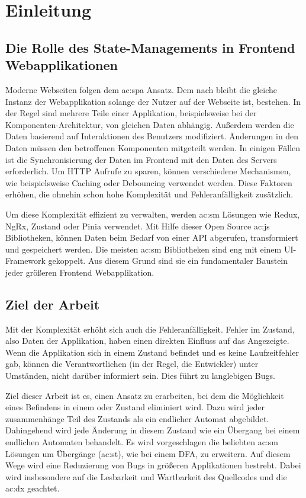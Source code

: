 \chapter{Einleitung}

\section{Die Rolle des State-Managements in Frontend Webapplikationen}

Moderne Webseiten folgen dem \acrlong{ac:spa} Ansatz. Dem nach bleibt die gleiche Instanz der Webapplikation solange der Nutzer auf der Webseite ist, bestehen. In der Regel sind mehrere Teile einer Applikation, beispielsweise bei der Komponenten-Architektur, von gleichen Daten abhängig. Außerdem werden die Daten basierend auf Interaktionen des Benutzers modifiziert. Änderungen in den Daten müssen den betroffenen Komponenten mitgeteilt werden. In einigen Fällen ist die Synchronisierung der Daten im Frontend mit den Daten des Servers erforderlich. Um HTTP Aufrufe zu sparen, können verschiedene Mechanismen, wie beispielsweise Caching oder Debouncing verwendet werden. Diese Faktoren erhöhen, die ohnehin schon hohe Komplexität und Fehleranfälligkeit zusätzlich.

Um diese Komplexität effizient zu verwalten, werden \acrlong{ac:sm} Lösungen wie Redux, NgRx, Zustand oder Pinia verwendet. Mit Hilfe dieser Open Source \acrlong{ac:js} Bibliotheken, können Daten beim Bedarf von einer API abgerufen, transformiert und gespeichert werden. Die meisten \acrlong{ac:sm} Bibliotheken sind eng mit einem UI-Framework gekoppelt. Aus diesem Grund sind sie ein fundamentaler Baustein jeder größeren Frontend Webapplikation.

\section{Ziel der Arbeit}

Mit der Komplexität erhöht sich auch die Fehleranfälligkeit. Fehler im Zustand, also Daten der Applikation, haben einen direkten Einfluss auf das Angezeigte. Wenn die Applikation sich in einem  Zustand befindet und es keine Laufzeitfehler gab, können die Verantwortlichen (in der Regel, die Entwickler) unter Umständen, nicht darüber informiert sein. Dies führt zu langlebigen Bugs.

Ziel dieser Arbeit ist es, einen Ansatz zu erarbeiten, bei dem die Möglichkeit eines Befindens in einem  oder  Zustand eliminiert wird. Dazu wird jeder zusammenhänge Teil des Zustands als ein endlicher Automat abgebildet. Dahingehend wird jede Änderung in diesem Zustand wie ein Übergang bei einem endlichen Automaten behandelt. Es wird vorgeschlagen die beliebten \acrlong{ac:sm} Lösungen um  Übergänge (\acrshort{ac:st}), wie bei einem DFA, zu erweitern. Auf diesem Wege wird eine Reduzierung von Bugs in größeren Applikationen bestrebt. Dabei wird insbesondere auf die Lesbarkeit und Wartbarkeit des Quellcodes und die \acrlong{ac:dx} geachtet.

